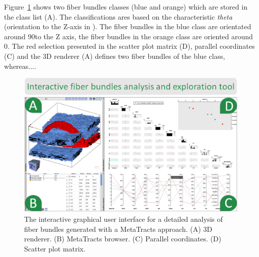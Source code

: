 Figure~\ref{fig:interactive_tool_gui} shows two fiber bundles classes (blue and orange) which are stored in the class list (A). The classifications ares based on the characteristic \textit{theta} (orientation to the Z-axis in \textdegree). The fiber bundles in the blue class are orientated around 90\textdegree to the Z axis, the fiber bundles in the orange class are oriented around 0\textdegree. The red selection presented in the scatter plot matrix (D), parallel coordinates (C) and the 3D renderer (A) defines two fiber bundles of the blue class, whereas....    

\begin{figure}[htb]
	\centering
	\includegraphics[width=\linewidth]{images/FiberScout_GUI.eps}
	\caption{The interactive graphical user interface for a detailed analysis of fiber bundles generated with a MetaTracts approach. (A) 3D renderer. (B) MetaTracts browser. (C) Parallel coordinates. (D) Scatter plot matrix. }
	\label{fig:interactive_tool_gui}
\end{figure}

